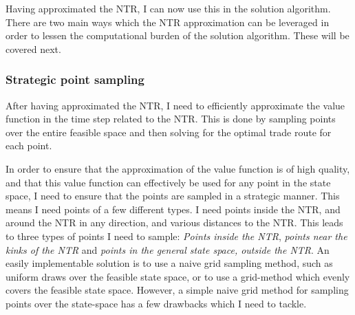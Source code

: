 \documentclass[11pt]{article}
\begin{document}
Having approximated the \ac{NTR}, I can now use this in the solution algorithm. There are two main ways which the \ac{NTR} approximation can be leveraged in order to
lessen the computational burden of the solution algorithm. These will be covered next.
\subsubsection{Strategic point sampling} \label{subsubsection: Sample}
After having approximated the \ac{NTR}, I need to efficiently approximate the value function in the time step related to the \ac{NTR}. 
This is done by sampling points over the entire feasible space and then solving for the optimal trade route for each point.

In order to ensure that the approximation of the value function is of high quality, and that this value function can effectively be used for any point in the state space,
I need to ensure that the points are sampled in a strategic manner. This means I need points of a few different types.
I need points inside the NTR, and around the \ac{NTR} in any direction, and various distances to the \ac{NTR}.
This leads to three types of points I need to sample: \textit{Points inside the \ac{NTR}}, \textit{points near the kinks of the \ac{NTR}} and \textit{points in the general state space, outside the \ac{NTR}}.
An easily implementable solution is to use a naive grid sampling method, such as uniform draws over the feasible state space, or to use a grid-method which evenly covers the feasible state space. 
However, a simple naive grid method for sampling points over the state-space has a few drawbacks which I need to tackle.
\end{document}
